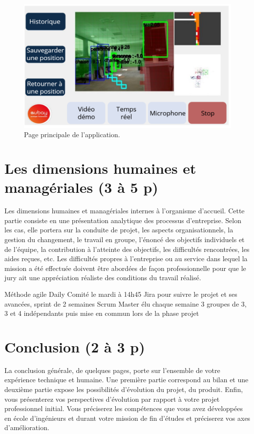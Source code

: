 \documentclass[11pt]{article}
\begin{document}
        \begin{figure}[hbt]  
          \includegraphics[width=\textwidth]{Application.png}    
          \caption{Page principale de l'application.}
          \label{fig:Application}
        \end{figure}     

  \pagebreak
  
  \section{Les dimensions humaines et managériales (3 à 5 p)}
  Les dimensions humaines et managériales internes à l’organisme d’accueil. Cette partie consiste en
  une présentation analytique des processus d’entreprise. Selon les cas, elle portera sur la conduite de
  projet, les aspects organisationnels, la gestion du changement, le travail en groupe, l’énoncé des
  objectifs individuels et de l’équipe, la contribution à l’atteinte des objectifs, les difficultés rencontrées,
  les aides reçues, etc. Les difficultés propres à l’entreprise ou au service dans lequel la mission a été
  effectuée doivent être abordées de façon professionnelle pour que le jury ait une appréciation réaliste
  des conditions du travail réalisé. 
  

  Méthode agile 
  Daily
  Comité le mardi à 14h45
  Jira pour suivre le projet et ses avancées, sprint de 2 semaines
  Scrum Master élu chaque semaine
  3 groupes de 3, 3 et 4 indépendants puis mise en commun lors de la phase projet

  \pagebreak
  
  \section{Conclusion (2 à 3 p)}
  La conclusion générale, de quelques pages, porte sur l’ensemble de votre expérience technique et
  humaine. Une première partie correspond au bilan et une deuxième partie expose les possibilités
  d’évolution du projet, du produit. Enfin, vous présenterez vos perspectives d’évolution par rapport à
  votre projet professionnel initial. Vous préciserez les compétences que vous avez développées en
  école d’ingénieurs et durant votre mission de fin d’études et préciserez vos axes d’amélioration.
\end{document}
